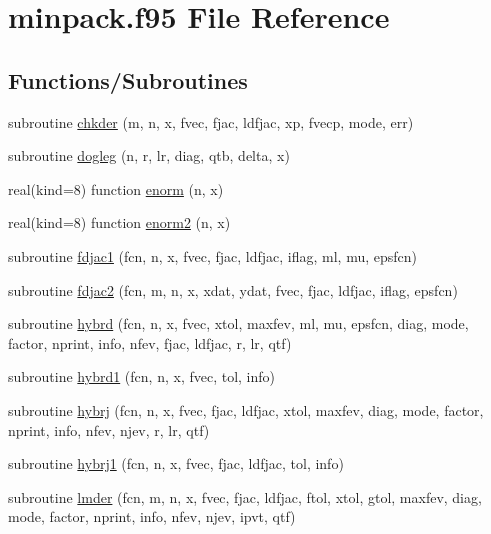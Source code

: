 \hypertarget{minpack_8f95}{}\section{minpack.\+f95 File Reference}
\label{minpack_8f95}
\subsection*{Functions/\+Subroutines}
\begin{DoxyCompactItemize}
\item 
subroutine \hyperlink{minpack_8f95_a0850d60ecd544bc0acd3fc391ff375ac}{chkder} (m, n, x, fvec, fjac, ldfjac, xp, fvecp, mode, err)
\item 
subroutine \hyperlink{minpack_8f95_ab5a1319962e4855e0a2b7a7431085275}{dogleg} (n, r, lr, diag, qtb, delta, x)
\item 
real(kind=8) function \hyperlink{minpack_8f95_a77bab828c23542feaca9eb2756475b89}{enorm} (n, x)
\item 
real(kind=8) function \hyperlink{minpack_8f95_a83e8b436deaf6a3de9bdf38fc2962d9a}{enorm2} (n, x)
\item 
subroutine \hyperlink{minpack_8f95_a327303574ddecf90e74bf7aaa64b5509}{fdjac1} (fcn, n, x, fvec, fjac, ldfjac, iflag, ml, mu, epsfcn)
\item 
subroutine \hyperlink{minpack_8f95_a49e6c47697604e26b8f5aae0c4fd9aef}{fdjac2} (fcn, m, n, x, xdat, ydat, fvec, fjac, ldfjac, iflag, epsfcn)
\item 
subroutine \hyperlink{minpack_8f95_a1e525d0d69e43bfda5f82e3bc4745b2f}{hybrd} (fcn, n, x, fvec, xtol, maxfev, ml, mu, epsfcn, diag, mode, factor, nprint, info, nfev, fjac, ldfjac, r, lr, qtf)
\item 
subroutine \hyperlink{minpack_8f95_a314aebdd90b16a874c0879d291a2190d}{hybrd1} (fcn, n, x, fvec, tol, info)
\item 
subroutine \hyperlink{minpack_8f95_a53ab26dfa98e1e91ba7a8c3e5f83ad13}{hybrj} (fcn, n, x, fvec, fjac, ldfjac, xtol, maxfev, diag, mode, factor, nprint, info, nfev, njev, r, lr, qtf)
\item 
subroutine \hyperlink{minpack_8f95_afefee19843910dca7f59c228bf69749d}{hybrj1} (fcn, n, x, fvec, fjac, ldfjac, tol, info)
\item 
subroutine \hyperlink{minpack_8f95_a29cf549303bc0ced9cb2e1ef2da0234b}{lmder} (fcn, m, n, x, fvec, fjac, ldfjac, ftol, xtol, gtol, maxfev, diag, mode, factor, nprint, info, nfev, njev, ipvt, qtf)
\item 

\end{DoxyCompactItemize}
